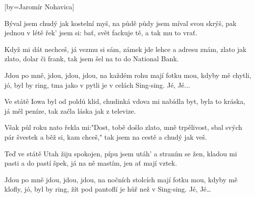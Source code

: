 [by={Jaromír Nohavica}]

\beginverse{}
Býval jsem chudý jak kostelní myš,
na půdě půdy jsem míval svou skrýš,
\lrep{} pak jednou v létě řek' jsem si: bať,
svět fackuje tě, a tak mu to vrať. \rrep{}
\endverse{}

\beginverse{}
Když mi dát nechceš, já vezmu si sám,
zámek jde lehce a adresu znám,
\lrep{} zlato jak zlato, dolar či frank,
tak jsem šel na to do National Bank. \rrep{}
\endverse{}

\beginchorus{}
Jdou po mně, jdou, jdou, jdou,
na každém rohu mají fotku mou,
kdyby mě chytli, jó, byl by ring,
tma jako v pytli je v celách Sing-sing. Jé, Jé... 
\endchorus{}

\beginverse{}
Ve státě Iowa byl od poldů klid,
chudinká vdova mi nabídla byt,
\lrep{} byla to kráska, já měl peníze,
tak začla láska jak z televize. \rrep{}
\endverse{}

\beginverse{}
Však půl roku nato řekla mi:"Dost,
tobě došlo zlato, mně trpělivost,
\lrep{} sbal svých pár švestek a běž si, kam chceš,"
tak jsem na cestě a chudý jak veš. \rrep{}
\endverse{}

\beginchorus{}
\phantom{}
\endchorus{}

\beginverse{}
Teď ve státě Utah žiju spokojen,
pípu jsem utáh' a straním se žen,
\lrep{} kladou mi pasti a do pastí špek,
já na ně mastím, jen ať mají vztek. \rrep{}
\endverse{}

\beginchorus{}
Jdou po mně jdou, jdou, jdou,
na nočních stolcích mají fotku mou,
kdyby mě klofly, jó, byl by ring,
žít pod pantoflí je hůř než v Sing-sing. Jé, Jé\ldots{}
\endchorus{}

\endsong{}
